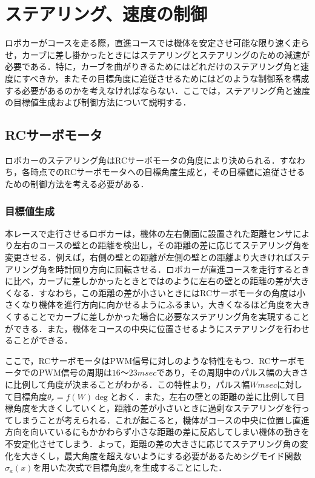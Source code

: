 \section{ステアリング、速度の制御}
  ロボカーがコースを走る際，直進コースでは機体を安定させ可能な限り速く走らせ，カーブに差し掛かったときにはステアリングとステアリングのための減速が必要である．特に，カーブを曲がりきるためにはどれだけのステアリング角と速度にすべきか，またその目標角度に追従させるためにはどのような制御系を構成する必要があるのかを考えなければならない．ここでは，ステアリング角と速度の目標値生成および制御方法について説明する．
 
 
\subsection{RCサーボモータ}
  ロボカーのステアリング角はRCサーボモータの角度により決められる．すなわち，各時点でのRCサーボモータへの目標角度生成と，その目標値に追従させるための制御方法を考える必要がある．

\subsubsection{目標値生成}
  本レースで走行させるロボカーは，機体の左右側面に設置された距離センサにより左右のコースの壁との距離を検出し，その距離の差に応じてステアリング角を変更させる．例えば，右側の壁との距離が左側の壁との距離より大きければステアリング角を時計回り方向に回転させる．ロボカーが直進コースを走行するときに比べ，カーブに差しかかったときとではのように左右の壁との距離の差が大きくなる．すなわち，この距離の差が小さいときにはRCサーボモータの角度は小さくなり機体を進行方向に向かせるようにふるまい，大きくなるほど角度を大きくすることでカーブに差しかかった場合に必要なステアリング角を実現することができる．また，機体をコースの中央に位置させるようにステアリングを行わせることができる．
  
  ここで，RCサーボモータはPWM信号に対しのような特性をもつ．RCサーボモータでのPWM信号の周期は$16〜23\unit{msec}$であり，その周期中のパルス幅の大きさに比例して角度が決まることがわかる．この特性より，パルス幅$W\unit{msec}$に対して目標角度$\theta_{r}=f(W)\unit{\deg}$とおく．また，左右の壁との距離の差に比例して目標角度を大きくしていくと，距離の差が小さいときに過剰なステアリングを行ってしまうことが考えられる．これが起こると，機体がコースの中央に位置し直進方向を向いているにもかかわらず小さな距離の差に反応してしまい機体の動きを不安定化させてしまう．よって，距離の差の大きさに応じてステアリング角の変化を大きくし，最大角度を超えないようにする必要があるためシグモイド関数$\sigma_{a}(x) $を用いた次式で目標角度$\theta_{r} $を生成することにした．

